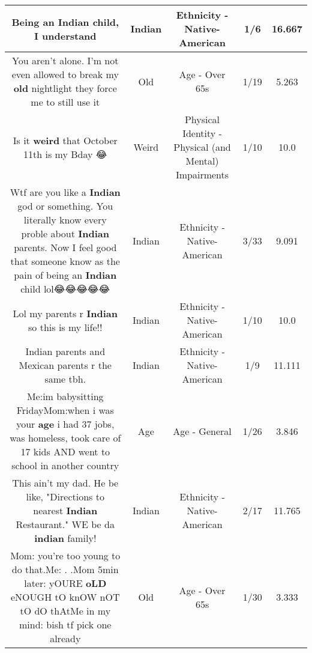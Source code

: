 \documentclass[11pt]{article}
\newlength\mylength
\begin{document}
\begin{center}
\begin{longtable}{|C{.65\mylength}|C{.30\mylength}|C{.12\mylength}|C{.12\mylength}|C{.12\mylength}|}
  \small Being an \textbf{Indian} child, I understand\normalsize   & Indian & Ethnicity - Native-American & 1/6 & 16.667 \\  \hline
  \small You aren't alone. I'm not even allowed to break my \textbf{old} nightlight they force me to still use it\normalsize   & Old & Age - Over 65s & 1/19 & 5.263 \\  \hline
  \small Is it \textbf{weird} that October 11th is my Bday 😂\normalsize   & Weird & Physical Identity - Physical (and Mental) Impairments & 1/10 & 10.0 \\  \hline
  \small Wtf are you like a \textbf{Indian} god or something. You literally know every proble about \textbf{Indian} parents. Now I feel good that someone know as the pain of being an \textbf{Indian} child lol😂😂😂😂😂\normalsize   & Indian & Ethnicity - Native-American & 3/33 & 9.091 \\  \hline
  \small Lol my parents r \textbf{Indian} so this is my life!!\normalsize   & Indian & Ethnicity - Native-American & 1/10 & 10.0 \\  \hline
  \small Indian parents and Mexican parents r the same tbh.\normalsize   & Indian & Ethnicity - Native-American & 1/9 & 11.111 \\  \hline
  \small Me:im babysitting FridayMom:when i was your \textbf{age} i had 37 jobs, was homeless, took care of 17 kids AND went to school in another country\normalsize   & Age & Age - General & 1/26 & 3.846 \\  \hline
  \small This ain't my dad. He be like, "Directions to nearest \textbf{Indian} Restaurant."  WE be da \textbf{indian} family!\normalsize   & Indian & Ethnicity - Native-American & 2/17 & 11.765 \\  \hline
  \small Mom: you're too young to do that.Me: . .Mom 5min later: yOURE \textbf{oLD} eNOUGH tO knOW nOT tO dO thAtMe in my mind: bish tf pick one already\normalsize   & Old & Age - Over 65s & 1/30 & 3.333 \\  \hline

\end{longtable}
\end{center}
\end{document}
